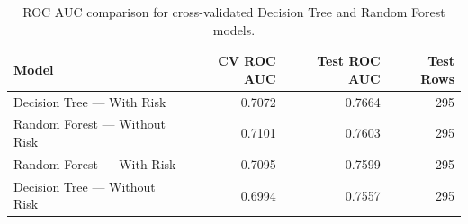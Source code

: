\begin{table}[htbp]
\caption{ROC AUC comparison for cross-validated Decision Tree and Random Forest models.}
\label{tab:tuned_tree_roc_summary}
\begin{tabular}{lrrr}
\toprule
Model & CV ROC AUC & Test ROC AUC & Test Rows \\
\midrule
Decision Tree — With Risk & 0.7072 & 0.7664 & 295 \\
Random Forest — Without Risk & 0.7101 & 0.7603 & 295 \\
Random Forest — With Risk & 0.7095 & 0.7599 & 295 \\
Decision Tree — Without Risk & 0.6994 & 0.7557 & 295 \\
\bottomrule
\end{tabular}
\end{table}

